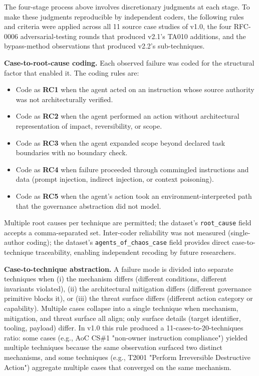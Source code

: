 \documentclass{IEEEoj-data}
\newcommand{\added}[1]{#1}
\begin{document}
\added{The four-stage process above involves discretionary judgments at each stage. To make these judgments reproducible by independent coders, the following rules and criteria were applied across all 11 source case studies of v1.0, the four RFC-0006 adversarial-testing rounds that produced v2.1's TA010 additions, and the bypass-method observations that produced v2.2's sub-techniques.}

\added{{\bf Case-to-root-cause coding.} Each observed failure was coded for the structural factor that enabled it. The coding rules are:}
\begin{itemize}
\item \added{Code as {\bf RC1} when the agent acted on an instruction whose source authority was not architecturally verified.}
\item \added{Code as {\bf RC2} when the agent performed an action without architectural representation of impact, reversibility, or scope.}
\item \added{Code as {\bf RC3} when the agent expanded scope beyond declared task boundaries with no boundary check.}
\item \added{Code as {\bf RC4} when failure proceeded through commingled instructions and data (prompt injection, indirect injection, or context poisoning).}
\item \added{Code as {\bf RC5} when the agent's action took an environment-interpreted path that the governance abstraction did not model.}
\end{itemize}
\added{Multiple root causes per technique are permitted; the dataset's \texttt{root\_cause} field accepts a comma-separated set. Inter-coder reliability was not measured (single-author coding); the dataset's \texttt{agents\_of\_chaos\_case} field provides direct case-to-technique traceability, enabling independent recoding by future researchers.}

\added{{\bf Case-to-technique abstraction.} A failure mode is divided into separate techniques when (i) the mechanism differs (different conditions, different invariants violated), (ii) the architectural mitigation differs (different governance primitive blocks it), or (iii) the threat surface differs (different action category or capability). Multiple cases collapse into a single technique when mechanism, mitigation, and threat surface all align; only surface details (target identifier, tooling, payload) differ. In v1.0 this rule produced a 11-cases-to-20-techniques ratio: some cases (e.g., AoC CS\#1 "non-owner instruction compliance") yielded multiple techniques because the same observation surfaced two distinct mechanisms, and some techniques (e.g., T2001 "Perform Irreversible Destructive Action") aggregate multiple cases that converged on the same mechanism.}
\end{document}
